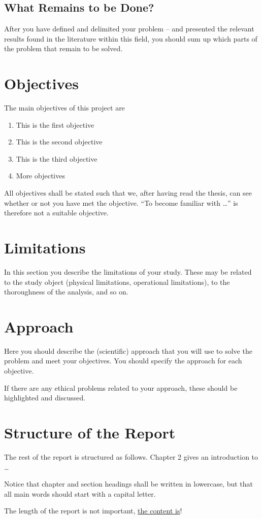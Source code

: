\subsection*{What Remains to be Done?}
After you have defined and delimited your problem -- and presented the relevant results found in the literature within this field, you should sum up which parts of the problem that remain to be solved.
\section{Objectives}
The main objectives of this project are
\begin{enumerate}
\item This is the first objective
\item This is the second objective
\item This is the third objective
\item More objectives
\end{enumerate}

All objectives shall be stated such that we, after having read the thesis, can see whether or not you have met the objective. ``To become familiar with \ldots'' is therefore not a suitable objective.

\section{Limitations}
In this section you describe the limitations of your study. These may be related to the study object (physical limitations, operational limitations), to the thoroughness of the analysis, and so on.
\section{Approach}
Here you should describe the (scientific) approach that you will use to solve the problem and meet your objectives. You should specify the approach for each objective.

If there are any ethical problems related to your approach, these should be highlighted and discussed.
\section{Structure of the Report}
The rest of the report is structured as follows. Chapter 2 gives an introduction to \ldots

\begin{remark}
Notice that chapter and section headings shall be written in lowercase, but that all main words should start with a capital letter.
\end{remark}
\vspace{2pc}

The length of the report is not important, \underline{the content is}! 

